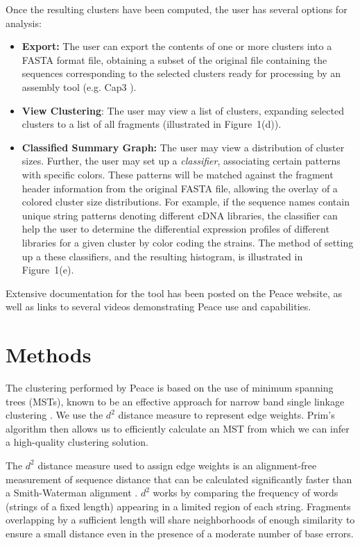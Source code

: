 \documentclass[a4,center,fleqn]{NAR}
\begin{document}
 Once the resulting clusters have been
computed, the user has several options
for analysis:
\begin{itemize}
\item {\bf Export:} The user can export the contents of one or more
  clusters into a FASTA format file, obtaining a subset of the original file
  containing the sequences corresponding to the selected clusters
  ready for processing by an assembly tool (e.g. {\sc Cap3} \cite{Huang99}).
\item {\bf View Clustering}: The user may view a list of clusters,
  expanding selected clusters to a list of all fragments (illustrated
  in Figure~1(d)).
\item {\bf Classified Summary Graph:} The user may view a distribution
  of cluster sizes.  Further, the user may set up a {\it classifier},
  associating certain patterns with specific colors.  These patterns
  will be matched against the fragment header information from the
  original FASTA file, allowing the overlay of a colored cluster size
  distributions.  For example, if the sequence names contain unique
  string patterns denoting different cDNA libraries, the classifier
  can help the user to determine the differential expression profiles
  of different libraries for a given cluster by color coding the
  strains.  The method of setting up a these classifiers, and the
  resulting histogram, is illustrated in Figure~1(e).
\end{itemize}
Extensive documentation for the tool has been posted on the {\sc
  Peace} website, as well as links to several videos demonstrating
{\sc Peace} use and capabilities.


\section{Methods}

The clustering performed by {\sc Peace} is based on the use of minimum
spanning trees (MSTs), known to be an effective approach for narrow
band single linkage clustering \cite{Jain99,Wan08}. We use the $d^2$
distance measure \cite{Hide94} to represent edge weights.  Prim's
algorithm \cite{Prim57} then allows us to efficiently calculate an
MST from which we can infer a high-quality clustering solution.

The $d^2$ distance measure used to assign edge weights is an
alignment-free measurement of sequence distance that can be calculated
significantly faster than a Smith-Waterman alignment \cite{Hide94}.
$d^2$ works by comparing the frequency of words (strings of a fixed
length) appearing in a limited region of each string.  Fragments
overlapping by a sufficient length will share neighborhoods of enough
similarity to ensure a small distance even in the presence of a
moderate number of base errors.
\end{document}
